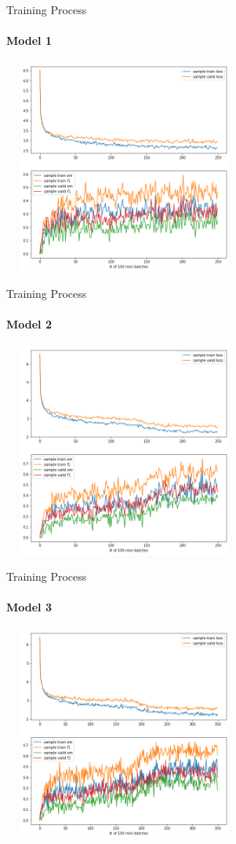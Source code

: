 \documentclass{beamer}
\begin{document}
\begin{frame}{Training Process}\framesubtitle{Model 1}
    \begin{center}
        \includegraphics[width=8cm, height=7cm]{figures/match_corrected.png}
    \end{center}

\end{frame}

\begin{frame}{Training Process}\framesubtitle{Model 2}
    \begin{center}
        \includegraphics[width=8cm, height=7cm]{figures/match_baseline.png}
    \end{center}
\end{frame}

\begin{frame}{Training Process}\framesubtitle{Model 3}
    \begin{center}
        \includegraphics[width=8cm, height=7cm]{figures/match_change1.png}
    \end{center}

\end{frame}
\end{document}
